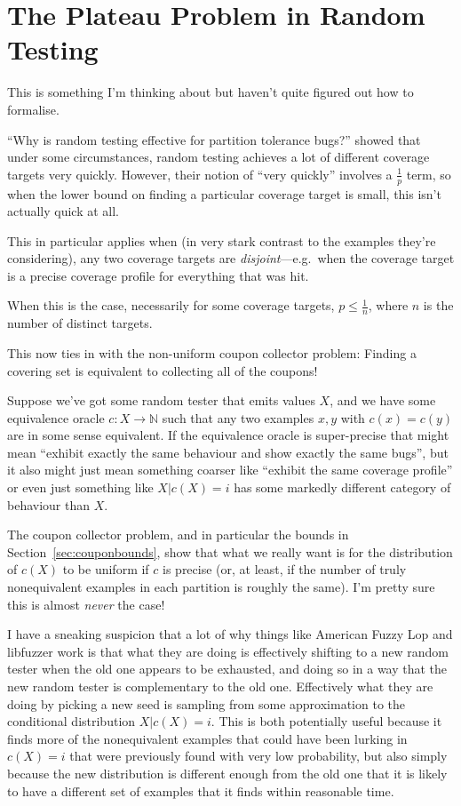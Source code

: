 \chapter{The Plateau Problem in Random Testing}

This is something I'm thinking about but haven't quite figured out how to formalise.

``Why is random testing effective for partition tolerance bugs?''\cite{DBLP:journals/pacmpl/MajumdarN18} showed that under some circumstances,
random testing achieves a lot of different coverage targets very quickly.
However, their notion of ``very quickly'' involves a \(\frac{1}{p}\) term,
so when the lower bound on finding a particular coverage target is small,
this isn't actually quick at all.

This in particular applies when (in very stark contrast to the examples they're considering),
any two coverage targets are \emph{disjoint}---e.g.\ 
when the coverage target is a precise coverage profile for everything that was hit.

When this is the case,
necessarily for some coverage targets, \(p \leq \frac{1}{n}\),
where \(n\) is the number of distinct targets.

This now ties in with the non-uniform coupon collector problem:
Finding a covering set is equivalent to collecting all of the coupons!

Suppose we've got some random tester that emits values \(X\),
and we have some equivalence oracle \(c: X \to \mathbb{N}\) such that any two examples \(x, y\) with \(c(x) = c(y)\) are in some sense equivalent.
If the equivalence oracle is super-precise that might mean ``exhibit exactly the same behaviour and show exactly the same bugs'',
but it also might just mean something coarser like ``exhibit the same coverage profile'' or even just something like \(X|c(X) = i\) has some markedly different category of behaviour than \(X\).

The coupon collector problem, and in particular the bounds in Section~\ref{sec:couponbounds},
show that what we really want is for the distribution of \(c(X)\) to be uniform if \(c\) is precise (or, at least, if the number of truly nonequivalent examples in each partition is roughly the same).
I'm pretty sure this is almost \emph{never} the case!

I have a sneaking suspicion that a lot of why things like American Fuzzy Lop and libfuzzer work is that what they are doing is effectively shifting to a new random tester when the old one appears to be exhausted,
and doing so in a way that the new random tester is complementary to the old one.
Effectively what they are doing by picking a new seed is sampling from some approximation to the conditional distribution \(X|c(X) = i\).
This is both potentially useful because it finds more of the nonequivalent examples that could have been lurking in \(c(X) = i\) that were previously found with very low probability,
but also simply because the new distribution is different enough from the old one that it is likely to have a different set of examples that it finds within reasonable time.
